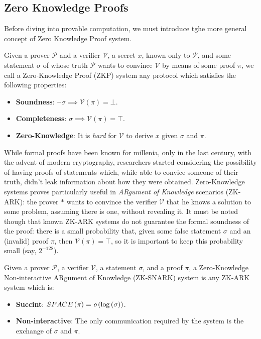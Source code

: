 \subsection{Zero Knowledge Proofs}
Before diving into provable computation, we must introduce tghe more general concept of Zero
Knowledge Proof system.
\begin{definition}
	Given a prover \(\mathcal{P}\) and a verifier \(\mathcal{V}\), a secret \(x\), known only to
	\(\mathcal{P}\), and some statement \(\sigma \) of whose truth \(\mathcal{P}\) wants to convince
	\(\mathcal{V}\) by means of some proof \(\pi \), we call a Zero-Knowledge Proof (ZKP) system any
	protocol which satisfies the following properties:
	\begin{itemize}
		\item \textbf{Soundness}: \(\neg{\sigma} \implies \mathcal{V}\left(\pi\right) = \bot \).
		\item \textbf{Completeness}: \(\sigma \implies \mathcal{V}\left(\pi\right) = \top \).
		\item \textbf{Zero-Knowledge}: It is \emph{hard} for \(\mathcal{V}\) to derive \(x\) given
		      \(\sigma \) and \(\pi \).
	\end{itemize}
\end{definition}

\noindent While formal proofs have been known for millenia, only in the last century, with the
advent of modern cryptography, researchers started considering the possibility of having proofs
of statements which, while able to convice someone of their truth, didn't leak information
about how they were obtained.
Zero-Knowledge systems proves particularly useful in \emph{ARgument of Knowledge} scenarios
(ZK-ARK): the prover \(*\) wants to convince the verifier \(\mathcal{V}\) that he
knows a solution to some problem, assuming there is one, without revealing it.
It must be noted though that known ZK-ARK systems do not guarantee the formal soundness of
the proof: there is a small probability that, given some false statement \(\sigma \) and an
(invalid) proof \(\pi \), then \(\mathcal{V}\left(\pi\right) = \top \), so it is important to keep
this probability small (say, \(2^{-128}\)).
\begin{definition}[ZK-SNARK]
	Given a prover \(\mathcal{P}\), a verifier \(\mathcal{V}\), a statement \(\sigma \), and a proof
	\(\pi \), a Zero-Knowledge Non-interactive ARgument of Knowledge (ZK-SNARK) system is any
	ZK-ARK system which is:
	\begin{itemize}
		\item \textbf{Succint}: \(SPACE\left(\pi\right) =
		      \textit{o}\left(\log\left(\sigma\right)\right)\).
		\item \textbf{Non-interactive}: The only communication required by the system is the exchange
		      of \(\sigma \) and \(\pi \).
	\end{itemize}
\end{definition}

